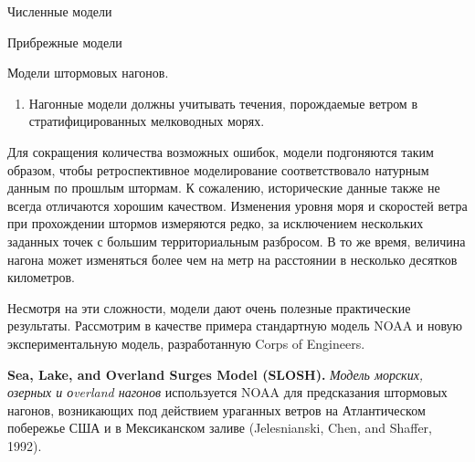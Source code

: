 \begin{chapter}{Численные модели}
\begin{section}{Прибрежные модели}
\begin{paragraph}{Модели штормовых нагонов.}
\begin{enumerate}
\item
Нагонные модели должны учитывать течения, порождаемые ветром в
стратифицированных мелководных морях.
%
\end{enumerate}
Для сокращения количества возможных ошибок, модели подгоняются таким образом,
чтобы ретроспективное моделирование соответствовало натурным данным по прошлым
штормам. К сожалению, исторические данные также не всегда отличаются
хорошим качеством. Изменения уровня моря и скоростей ветра при прохождении 
штормов измеряются редко, за исключением нескольких заданных точек с большим
территориальным разбросом. В то же время, величина нагона может изменяться 
более чем на метр на расстоянии в несколько десятков километров.
%

Несмотря на эти сложности, модели дают очень полезные практические
результаты. Рассмотрим в качестве примера стандартную модель NOAA
и новую экспериментальную модель, разработанную Corps of Engineers.
%

\textbf{Sea, Lake, and Overland Surges Model (SLOSH).}%
\emph{Модель морских, озерных и оverland нагонов} используется NOAA
для предсказания штормовых нагонов, возникающих под действием ураганных ветров
на Атлантическом побережье США и в Мексиканском заливе (Jelesnianski, Chen,
and Shaffer, 1992).
%


\end{paragraph}
\end{section}
\end{chapter}
